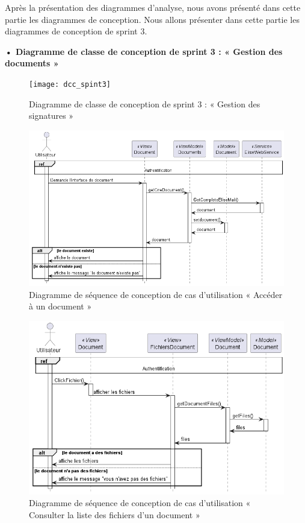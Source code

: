 Après la présentation des diagrammes d'analyse, nous avons présenté dans cette partie les diagrammes de conception.
Nous allons présenter dans cette partie les diagrammes de conception de sprint 3.
\newpage 
\begin{landscape}

\textbf{•	Diagramme de classe de conception de sprint 3 : « Gestion des documents »}

\begin{figure}[H]
  \centering
  \texttt{[image: dcc\_spint3]}
  \caption{Diagramme de classe de conception de sprint 3 : « Gestion des signatures »}
  \label{fig:class_diagram_signatures3}
\end{figure}
\end{landscape}
\newpage
\begin{figure}[H]
  \centering
  \includegraphics[width=1\textwidth]{out/diagrams/documents/sequence_preview/sequence_preview}
  \caption{Diagramme de séquence de conception de cas d'utilisation « Accéder à un document »}
  \label{fig:sequence_conception_preview_document}
\end{figure}
\begin{figure}[H]
  \centering
  \includegraphics[width=1\textwidth]{out/diagrams/documents/sequence_preview_files/sequence_preview_files}
  \caption{Diagramme de séquence de conception de cas d'utilisation « Consulter la liste des fichiers d'un document »}
  \label{fig:sequence_conception_previewFiles}
\end{figure}
